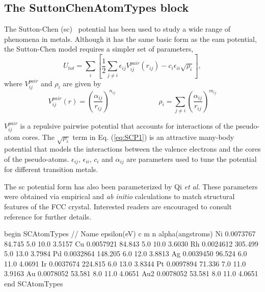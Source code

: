 \documentclass[]{book}
\begin{document}
\subsection{\label{section:ffSC}The SuttonChenAtomTypes block}

The Sutton-Chen ({\sc sc})~\cite{Chen90} potential has been used to
study a wide range of phenomena in metals.  Although it has the same
basic form as the {\sc eam} potential, the Sutton-Chen model requires
a simpler set of parameters,
\begin{equation}
\label{eq:SCP1}
U_{tot}=\sum _{i}\left[ \frac{1}{2}\sum _{j\neq
i}\epsilon_{ij}V^{pair}_{ij}(r_{ij})-c_{i}\epsilon_{ii}\sqrt{\rho_{i}}\right] ,
\end{equation}
 where $V^{pair}_{ij}$ and $\rho_{i}$ are given by 
\begin{equation}
\label{eq:SCP2}
V^{pair}_{ij}(r)=\left(
\frac{\alpha_{ij}}{r_{ij}}\right)^{n_{ij}} \hspace{1in} \rho_{i}=\sum_{j\neq i}\left(
\frac{\alpha_{ij}}{r_{ij}}\right) ^{m_{ij}}
\end{equation}

$V^{pair}_{ij}$ is a repulsive pairwise potential that accounts for
interactions of the pseudo-atom cores.  The $\sqrt{\rho_i}$ term in
Eq. (\ref{eq:SCP1}) is an attractive many-body potential that models
the interactions between the valence electrons and the cores of the
pseudo-atoms.  $\epsilon_{ij}$, $\epsilon_{ii}$, $c_i$ and
$\alpha_{ij}$ are parameters used to tune the potential for different
transition metals.

The {\sc sc} potential form has also been parameterized by Qi {\it et
al.}\cite{Qi99} These parameters were obtained via empirical and {\it
ab initio} calculations to match structural features of the FCC
crystal.  Interested readers are encouraged to consult reference
\citealp{Qi99} for further details.

\begin{code}[caption={[An example of a SCAtomTypes block.] A
simple example of a SCAtomTypes block.  Distances ($\alpha$)
are given in \AA\ and energies ($\epsilon$) are (by convention) given in
units of eV.  These units must be specified in the {\tt Options} block
using the keyword {\tt MetallicEnergyUnitScaling}.  Without this {\tt
Options} keyword, the default units for $\epsilon$ are kcal/mol.  The
other parameters, $m$, $n$, and $c$ are unitless.},
label={sch:SCAtomTypes}]
begin SCAtomTypes
// Name  epsilon(eV)      c      m       n      alpha(angstroms)
Ni      0.0073767       84.745  5.0     10.0    3.5157 
Cu      0.0057921       84.843  5.0     10.0    3.6030
Rh      0.0024612       305.499 5.0     13.0    3.7984
Pd      0.0032864       148.205 6.0     12.0    3.8813
Ag      0.0039450       96.524  6.0     11.0    4.0691
Ir      0.0037674       224.815 6.0     13.0    3.8344  
Pt      0.0097894       71.336  7.0     11.0    3.9163
Au      0.0078052       53.581  8.0     11.0    4.0651
Au2     0.0078052       53.581  8.0     11.0    4.0651
end SCAtomTypes
\end{code}
\end{document}
